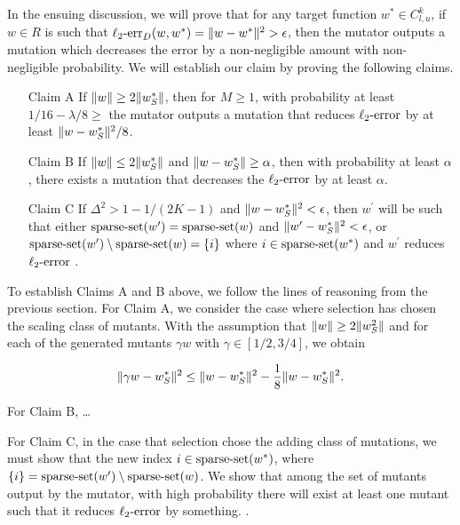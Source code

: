 In the ensuing discussion, we will prove that for any target function
$w^* \in C^k_{l,u}$, if $w \in R$ is such that
$\mathrm{\ell_2\mbox{-}err}_D(w, w^*) = \Vert w - w^* \Vert^2 > \epsilon$,
then the mutator outputs a mutation which decreases the error by a
non-negligible amount with non-negligible probability.
We will establish our claim by proving the following claims.

\begin{enumerate}
\item[Claim A] If $\Vert w \Vert \ge 2 \Vert w^*_S \Vert$, then for $M \ge 1$,
with probability at least $1/16 - \lambda/8 \ge $  the mutator outputs
a mutation that reduces $\mathrm{\ell_2\mbox{-}error}$ by at least $\Vert w - w^*_S \Vert^2 / 8$.
\item[Claim B] If $\Vert w \Vert \le 2 \Vert w^*_S \Vert$ and
$\Vert w - w^*_S \Vert \ge \alpha$, then with probability at least $\alpha$,
there exists a mutation that decreases the $\mathrm{\ell_2\mbox{-}error}$ by at least $\alpha$.
\item[Claim C] If $\Delta^2 > 1 - 1/(2 K - 1)$ and
$\Vert w - w^*_S \Vert^2 < \epsilon$, then $w^\prime$ will be
such that either $\mathrm{sparse\mbox{-}set}(w^\prime) = \mathrm{sparse\mbox{-}set}(w)$ and
$\Vert w^\prime - w^*_S \Vert^2 < \epsilon$, or
$\mathrm{sparse\mbox{-}set}(w^\prime) \setminus \mathrm{sparse\mbox{-}set}(w) = \{i\}$ where $i \in \mathrm{sparse\mbox{-}set}(w^*)$
and $w^\prime$ reduces $\mathrm{\ell_2\mbox{-}error}$ .
\end{enumerate}

To establish Claims A and B above, we follow the lines of reasoning from the
previous section.
For Claim A, we consider the case where selection has chosen the scaling class
of mutants.  With the assumption that $\Vert w \Vert \ge 2 \Vert w_S^2 \Vert$ and
for each of the generated mutants $\gamma w$ with $\gamma \in [1/2, 3/4]$,
we obtain

\[
\Vert \gamma w - w^*_S \Vert^2 \le \Vert w - w^*_S \Vert^2 - \frac{1}{8}\Vert w - w^*_S \Vert^2.
\]

For Claim B, \dots

For Claim C, in the case that selection chose the adding class of mutations,
we must show that the new index $i \in \mathrm{sparse\mbox{-}set}(w^*)$, where
$\{i\} = \mathrm{sparse\mbox{-}set}(w^\prime) \setminus \mathrm{sparse\mbox{-}set}(w)$.
We show that among the set of mutants output by the mutator, with high probability
there will exist at least one mutant such that it reduces $\mathrm{\ell_2\mbox{-}error}$ by something.
.

